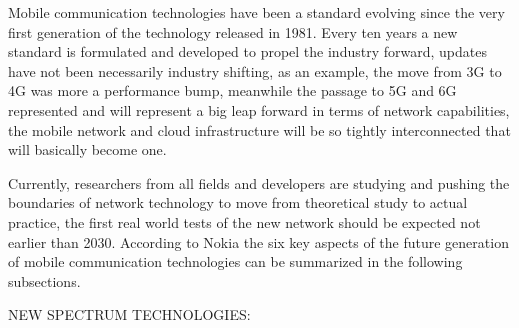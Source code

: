 

Mobile communication technologies have been a standard evolving since the very first
generation of the technology released in 1981. Every ten years a new standard is formulated and
developed to propel the industry forward, updates have not been necessarily industry shifting, as an
example, the move from 3G to 4G was more a performance bump, meanwhile the passage to 5G and 6G
represented and will represent a big leap forward in terms of network capabilities, the mobile
network and cloud infrastructure will be so tightly interconnected that will basically become one.

Currently, researchers from all fields and developers are studying and pushing the boundaries of
network technology to move from theoretical study to actual practice, the first real world tests of
the new network should be expected not earlier than 2030. According to Nokia\cite{nokiabell} the six
key aspects of the future generation of mobile communication technologies can be summarized in the
following subsections.

\bigskip
\noindent
NEW SPECTRUM TECHNOLOGIES:
\label{ssec:spectrum-technologies}

